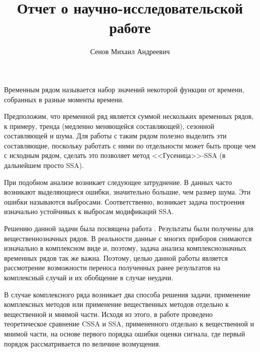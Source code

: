 \documentclass[specialist,
               substylefile = spbu.rtx,
               subf,href,colorlinks=true, 12pt]{disser}
\begin{document}

\title{Отчет о научно-исследовательской работе}


\author{Сенов Михаил Андреевич}


\date{\number\year}

\maketitle

\tableofcontents

\intro
Временным рядом называется набор значений некоторой функции от времени, собранных в разные моменты времени.

Предположим, что временной ряд является суммой нескольких временных рядов, к примеру, тренда (медленно меняющейся составляющей), сезонной составляющей и шума. Для работы с таким рядом полезно выделить эти составляющие, поскольку работать с ними по отдельности может быть проще чем с исходным рядом, сделать это позволяет метод <<Гусеница>>-SSA (в дальнейшем просто SSA).

При подобном анализе возникает следующее затруднение. В данных часто возникают выделяющиеся ошибки, значительно большие, чем размер шума. Эти ошибки называются выбросами. Соответственно, возникает задача построения изначально устойчивых к выбросам модификаций SSA. 

Решению данной задачи была посвящена работа \cite{Tretyakova20}. Результаты были получены для вещественнозначных рядов. В реальности данные с многих приборов снимаются изначально в комплексном виде и, поэтому, задача анализа комплекснозначных временных рядов так же важна. Поэтому, целью данной работы является рассмотрение возможности переноса полученных ранее результатов на комплексный случай и их обобщение в случае неудачи.

В случае комплексного ряда возникает два способа решения задачи, применение комплексных методов или применение вещественных методов отдельно к вещественной и мнимой части. Исходя из этого, в работе проведено теоретическое сравнение CSSA и SSA, примененного отдельно к вещественной и мнимой части, на основе первого порядка ошибки оценки сигнала, где первый порядок рассматривается по величине возмущения.
\end{document}
